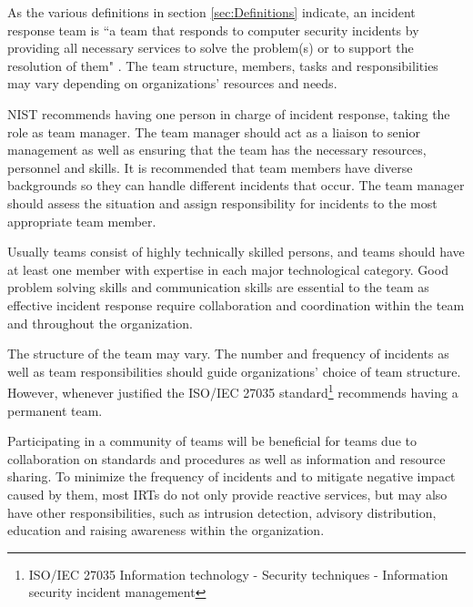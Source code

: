 As the various definitions in section \ref{sec:Definitions} indicate, an incident response team is ``a team that responds to computer security incidents by providing all necessary services to solve the problem(s) or to support the resolution of them" \cite{enisaCSIRTGoodPractices}. The team structure, members, tasks and responsibilities may vary depending on organizations' resources and needs. 

\ac{NIST} recommends having one person in charge of incident response, taking the role as team manager. The team manager should act as a liaison to senior management as well as ensuring that the team has the necessary resources, personnel and skills. It is recommended that team members have diverse backgrounds so they can handle different incidents that occur. The team manager should assess the situation and assign responsibility for incidents to the most appropriate team member. \cite{nist800-61}

Usually teams consist of highly technically skilled persons, and teams should have at least one member with expertise in each major technological category. Good problem solving skills and communication skills are essential to the team as effective incident response require collaboration and coordination within the team and throughout the organization. \cite{nist800-61}

The structure of the team may vary. The number and frequency of incidents as well as team responsibilities should guide organizations' choice of team structure. However, whenever justified  the ISO/IEC 27035 standard\footnote{ISO/IEC 27035 Information technology - Security techniques - Information security incident management} recommends having a permanent team. \cite{ISO/IEC27035}

%

Participating in a community of teams will be beneficial for teams due to collaboration on standards and procedures as well as information and resource sharing. To minimize the frequency of incidents and to mitigate negative impact caused by them, most \acp{IRT} do not only provide reactive services, but may also have other responsibilities, such as intrusion detection, advisory distribution, education and raising awareness within the organization. \cite{nist800-61}  
  
